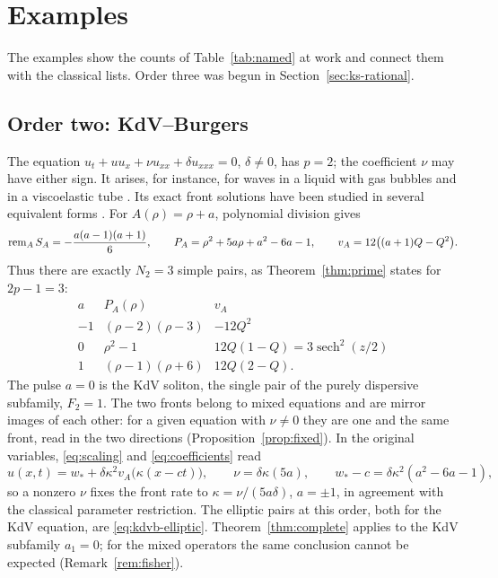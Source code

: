 \section{Examples}\label{sec:examples}

The examples show the counts of Table~\ref{tab:named} at work and
connect them with the classical lists. Order three was begun in
Section~\ref{sec:ks-rational}.

\subsection{Order two: KdV--Burgers}\label{sec:kdvb}

The equation \(u_t+uu_x+\nu u_{xx}+\delta u_{xxx}=0\), \(\delta\ne0\),
has \(p=2\); the coefficient \(\nu\) may have either sign. It arises,
for instance, for waves in a liquid with gas bubbles
\citep{KudryashovSinelshchikovFourthOrder2010} and in a viscoelastic
tube \citep{KudryashovSinelshchikovChernyavsky2008}. Its exact front
solutions have been studied in several equivalent forms
\citep{Kudryashov1988,JeffreyXu1989,VliegHalford1991,Kudryashov2009Errors,Kudryashov2009KdVB}.
For \(A(\rho)=\rho+a\), polynomial division gives
\begin{equation}\label{eq:kdvb-matching}
 \operatorname{rem}_{A} S_A=-\frac{a(a-1)(a+1)}6,\qquad
 P_A=\rho^2+5a\rho+a^2-6a-1,\qquad
 v_A=12\bigl((a+1)Q-Q^2\bigr).
\end{equation}
Thus there are exactly \(N_2=3\) simple pairs, as
Theorem~\ref{thm:prime} states for \(2p-1=3\):
\begin{equation}\label{eq:kdvb-pairs}
 \begin{array}{c|c|c}
 a&P_A(\rho)&v_A\\ \hline
 -1&(\rho-2)(\rho-3)&-12Q^2\\
 0&\rho^2-1&12Q(1-Q)=3\operatorname{sech}^2(z/2)\\
 1&(\rho-1)(\rho+6)&12Q(2-Q).
 \end{array}
\end{equation}
The pulse \(a=0\) is the KdV soliton, the single pair of the purely
dispersive subfamily, \(F_2=1\). The two fronts belong to mixed
equations and are mirror images of each other: for a given equation
with \(\nu\ne0\) they are one and the same front, read in the two
directions (Proposition~\ref{prop:fixed}). In the original variables,
\eqref{eq:scaling} and \eqref{eq:coefficients} read
\[
 u(x,t)=w_\ast+\delta\kappa^2v_A\bigl(\kappa(x-ct)\bigr),\qquad
 \nu=\delta\kappa(5a),\qquad
 w_\ast-c=\delta\kappa^2(a^2-6a-1),
\]
so a nonzero \(\nu\) fixes the front rate to
\(\kappa=\nu/(5a\delta)\), \(a=\pm1\), in agreement with the classical
parameter restriction. The elliptic pairs at this order, both for the
KdV equation, are \eqref{eq:kdvb-elliptic}. Theorem~\ref{thm:complete}
applies to the KdV subfamily \(a_1=0\); for the mixed operators the
same conclusion cannot be expected (Remark~\ref{rem:fisher}).

